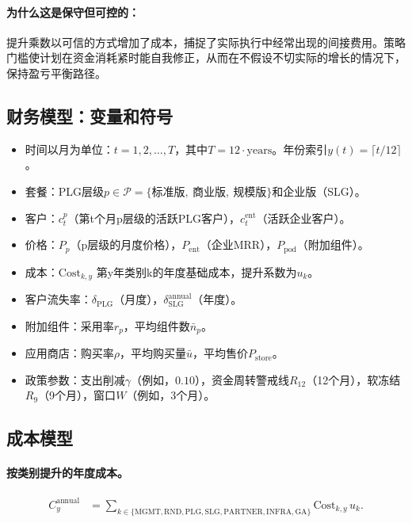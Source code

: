 \documentclass[11点, A4纸, 单面]{article}
\begin{document}
\paragraph{为什么这是保守但可控的：}
提升乘数以可信的方式增加了成本，捕捉了实际执行中经常出现的间接费用。策略门槛使计划在资金消耗紧时能自我修正，从而在不假设不切实际的增长的情况下，保持盈亏平衡路径。

\subsection{财务模型：变量和符号}
\begin{itemize}
  \item 时间以月为单位：$t = 1,2,\dots,T$，其中$T = 12 \cdot \text{years}$。年份索引$y(t) = \lceil t/12 \rceil$。
  \item 套餐：PLG层级$p \in \mathcal{P}=\{\text{标准版},\ \text{商业版},\ \text{规模版}\}$和企业版（SLG）。
  \item 客户：$c^p_t$（第t个月p层级的活跃PLG客户），$c^{\mathrm{ent}}_t$（活跃企业客户）。
  \item 价格：$P_p$（p层级的月度价格），$P_{\mathrm{ent}}$（企业MRR），$P_{\mathrm{pod}}$（附加组件）。
  \item 成本：$\mathrm{Cost}_{k,y}$ 第y年类别k的年度基础成本，提升系数为$u_k$。
  \item 客户流失率：$\delta_{\mathrm{PLG}}$（月度），$\delta^{\mathrm{annual}}_{\mathrm{SLG}}$（年度）。
  \item 附加组件：采用率$r_p$，平均组件数$\bar{n}_p$。
  \item 应用商店：购买率$\rho$，平均购买量$\bar{u}$，平均售价$P_{\mathrm{store}}$。
  \item 政策参数：支出削减$\gamma$（例如，$0.10$），资金周转警戒线$R_{12}$（12个月），软冻结$R_{9}$（9个月），窗口$W$（例如，$3$个月）。
\end{itemize}

\newpage
\subsection{成本模型}
\paragraph{按类别提升的年度成本。}
\begin{align}
C^{\mathrm{annual}}_y 
  &= \sum_{k \in \{\mathrm{MGMT},\mathrm{RND},\mathrm{PLG},\mathrm{SLG},\mathrm{PARTNER},\mathrm{INFRA},\mathrm{GA}\}}
     \mathrm{Cost}_{k,y}\, u_k.
\end{align}
\end{document}
